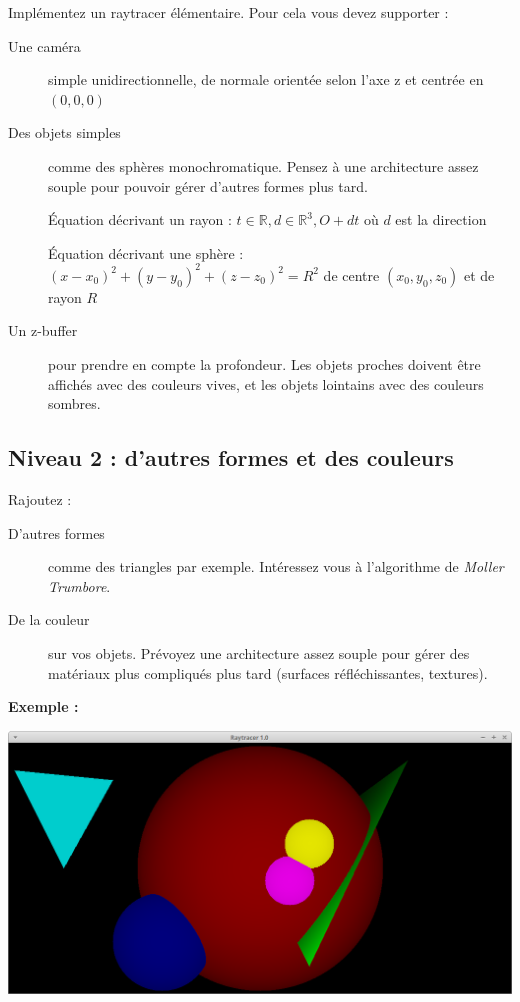 \documentclass[a4paper, 11pt]{article}
\begin{document}
Implémentez un raytracer élémentaire. Pour cela vous devez supporter :  
  
\begin{description}
\item [Une caméra] simple unidirectionnelle, de normale orientée selon l'axe z et centrée en $(0, 0, 0)$
\item [Des objets simples] comme des sphères monochromatique. Pensez à une architecture assez souple pour pouvoir gérer d'autres formes plus tard. 

Équation décrivant un rayon : $ t\in \mathbb{R}, d\in \mathbb{R}^3, O + dt$ où $d$ est la direction
 
Équation décrivant une sphère : $(x - x_0)^2 + (y - y_0)^2 + (z - z_0)^2 = R^2$ de centre $(x_0, y_0, z_0)$ et de rayon $R$
\item [Un z-buffer] pour prendre en compte la profondeur. Les objets proches doivent être affichés avec des couleurs vives, et les objets lointains avec des couleurs sombres. 
  
\end{description}  

\subsection*{Niveau 2 : d'autres formes et des couleurs}

Rajoutez :

\begin{description}
\item [D'autres formes] comme des triangles par exemple. Intéressez vous à l'algorithme de \textit{Moller Trumbore}.  
\item [De la couleur] sur vos objets. Prévoyez une architecture assez souple pour gérer des matériaux plus compliqués plus tard (surfaces réfléchissantes, textures).  
  
\end{description}  

\textbf{Exemple :}
  
\begin{center}
\includegraphics[scale=0.25]{correct1.png} 
\end{center}
\end{document}
